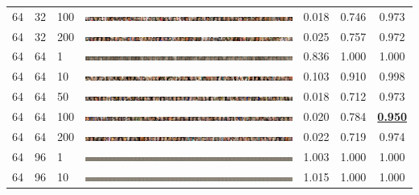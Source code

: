 \documentclass[a4paper]{article}
\begin{document}
\begin{table}[h!]
\begin{center}
{\begin{tabular}{lllcccc}
      64 & 32 & 100 & \includegraphics[width=\textwidth,trim={1536px 0 0 0},clip]{figures/faces_g64_d32_ep100_generator.jpg}  & 0.018 & 0.746 & 0.973\\
      64 & 32 & 200 & \includegraphics[width=\textwidth,trim={1536px 0 0 0},clip]{figures/faces_g64_d32_ep200_generator.jpg}  & 0.025 & 0.757 & 0.972\\
      \hline
      64 & 64 & 1   & \includegraphics[width=\textwidth,trim={1536px 0 0 0},clip]{figures/faces_g64_d64_ep1_generator.jpg}    & 0.836 & 1.000 & 1.000\\
      64 & 64 & 10  & \includegraphics[width=\textwidth,trim={1536px 0 0 0},clip]{figures/faces_g64_d64_ep10_generator.jpg}   & 0.103 & 0.910 & 0.998\\
      64 & 64 & 50  & \includegraphics[width=\textwidth,trim={1536px 0 0 0},clip]{figures/faces_g64_d64_ep50_generator.jpg}   & 0.018 & 0.712 & 0.973\\
      64 & 64 & 100 & \includegraphics[width=\textwidth,trim={1536px 0 0 0},clip]{figures/faces_g64_d64_ep100_generator.jpg}  & 0.020 & 0.784 & \underline{\bf 0.950}\\
      64 & 64 & 200 & \includegraphics[width=\textwidth,trim={1536px 0 0 0},clip]{figures/faces_g64_d64_ep200_generator.jpg}  & 0.022 & 0.719 & 0.974\\
      \hline
      64 & 96 & 1   & \includegraphics[width=\textwidth,trim={1536px 0 0 0},clip]{figures/faces_g64_d96_ep1_generator.jpg}    & 1.003 & 1.000 & 1.000\\
      64 & 96 & 10  & \includegraphics[width=\textwidth,trim={1536px 0 0 0},clip]{figures/faces_g64_d96_ep10_generator.jpg}   & 1.015 & 1.000 & 1.000\\

\end{tabular}}
\end{center}
\end{table}
\end{document}
